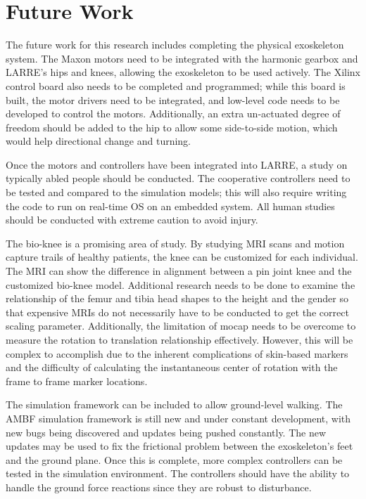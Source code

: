\section{Future Work}

The future work for this research includes completing the physical exoskeleton system. The Maxon motors need to be integrated with the harmonic gearbox and LARRE's hips and knees, allowing the exoskeleton to be used actively. The Xilinx control board also needs to be completed and programmed; while this board is built, the motor drivers need to be integrated, and low-level code needs to be developed to control the motors. Additionally, an extra un-actuated degree of freedom should be added to the hip to allow some side-to-side motion, which would help directional change and turning. 

Once the motors and controllers have been integrated into LARRE, a study on typically abled people should be conducted. The cooperative controllers need to be tested and compared to the simulation models; this will also require writing the code to run on real-time OS on an embedded system. All human studies should be conducted with extreme caution to avoid injury. 

The bio-knee is a promising area of study. By studying MRI scans and motion capture trails of healthy patients, the knee can be customized for each individual. The MRI can show the difference in alignment between a pin joint knee and the customized bio-knee model. Additional research needs to be done to examine the relationship of the femur and tibia head shapes to the height and the gender so that expensive MRIs do not necessarily have to be conducted to get the correct scaling parameter. Additionally, the limitation of mocap needs to be overcome to measure the rotation to translation relationship effectively. However, this will be complex to accomplish due to the inherent complications of skin-based markers and the difficulty of calculating the instantaneous center of rotation with the frame to frame marker locations.  

The simulation framework can be included to allow ground-level walking. The AMBF simulation framework is still new and under constant development, with new bugs being discovered and updates being pushed constantly. The new updates may be used to fix the frictional problem between the exoskeleton's feet and the ground plane. Once this is complete, more complex controllers can be tested in the simulation environment. The controllers should have the ability to handle the ground force reactions since they are robust to disturbance. 


